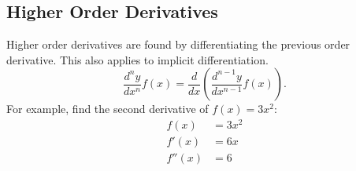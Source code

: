 \subsection{Higher Order Derivatives}
Higher order derivatives are found by differentiating the previous order derivative. This also applies to implicit differentiation.
\[ \frac{d^n y}{dx^n} f(x) = \frac{d}{dx} \left( \frac{d^{n-1} y}{dx^{n-1}} f(x) \right). \]
For example, find the second derivative of $f(x) = 3x^2$:
\begin{align*}
	f(x) &= 3x^2 \\
	f'(x) &= 6x \\
	f''(x) &= 6
\end{align*}
